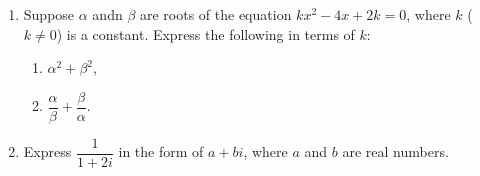\documentclass[11pt]{article}
\begin{document}
\begin{enumerate}
            \hrulefill
            
            \hrulefill
            
            \hrulefill
            
            \hrulefill
            
            \hrulefill

        \item Suppose $\alpha$ andn $\beta$ are roots of the equation $kx^2-4x+2k=0$, where $k$ ($k\neq 0$) is a constant. Express the following in terms of $k$:\begin{enumerate}
            \item $\alpha^2+\beta^2$,
            \item $\dfrac{\alpha}{\beta}+\dfrac{\beta}{\alpha}$.
        \end{enumerate}

        \hrulefill

            \hrulefill
            
            \hrulefill
            
            \hrulefill
            
            \hrulefill
            
            \hrulefill
            
            \hrulefill
            
            \hrulefill
            
            \hrulefill
            
            \hrulefill
            
            \hrulefill
            
            \hrulefill

        \pagebreak
        \item Express $\dfrac{1}{1+2i}$ in the form of $a+bi$, where $a$ and $b$ are real numbers.
        
        \hrulefill

            \hrulefill
            
            \hrulefill
            
            \hrulefill
            
            \hrulefill
            
            \hrulefill
            
            \hrulefill
            
            \hrulefill
            
            \hrulefill
            

\end{enumerate}
\end{document}
